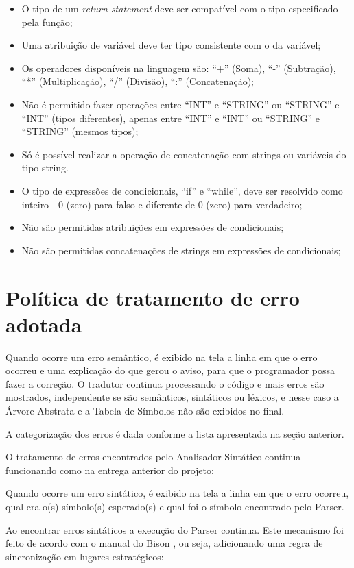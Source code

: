 \documentclass[12pt]{article}
\begin{document}
\begin{itemize}
	\item O tipo de um \textit{return statement} deve ser compatível com o tipo especificado pela função;
	\item Uma atribuição de variável deve ter tipo consistente com o da variável;
	\item Os operadores disponíveis na linguagem são: ``+'' (Soma), ``-'' (Subtração), ``*'' (Multiplicação), ``/'' (Divisão), ``:'' (Concatenação);
	\item Não é permitido fazer operações entre ``INT'' e ``STRING'' ou ``STRING'' e ``INT'' (tipos diferentes), apenas entre ``INT'' e ``INT'' ou ``STRING'' e ``STRING'' (mesmos tipos);
	\item Só é possível realizar a operação de concatenação com strings ou variáveis do tipo string.\\
	\item O tipo de expressões de condicionais, ``if'' e ``while'', deve ser resolvido como inteiro - 0 (zero) para falso e diferente de 0 (zero) para verdadeiro;
	\item Não são permitidas atribuições em expressões de condicionais;
	\item Não são permitidas concatenações de strings em expressões de condicionais;
\end{itemize}


\section{Política de tratamento de erro adotada}

\indent

Quando ocorre um erro semântico, é exibido na tela a linha em que o erro ocorreu e uma explicação do que gerou o aviso, para que o programador possa fazer a correção. O tradutor continua processando o código e mais erros são mostrados, independente se são semânticos, sintáticos ou léxicos, e nesse caso a Árvore Abstrata e a Tabela de Símbolos não são exibidos no final.

A categorização dos erros é dada conforme a lista apresentada na seção anterior.

O tratamento de erros encontrados pelo Analisador Sintático continua funcionando como na entrega anterior do projeto:

Quando ocorre um erro sintático, é exibido na tela a linha em que o erro ocorreu, qual era o(s) símbolo(s) esperado(s) e qual foi o símbolo encontrado pelo Parser.

Ao encontrar erros sintáticos a execução do Parser continua. Este mecanismo foi feito de acordo com o manual do Bison \cite{bisonmanual}, ou seja, adicionando uma regra de sincronização em lugares estratégicos:
\end{document}
